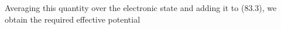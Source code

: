 Averaging this quantity over the electronic state and adding it to (83.3), we obtain the required effective potential
